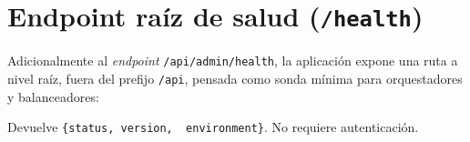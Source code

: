 \section{Endpoint raíz de salud (\texttt{/health})}
\label{sec:api-health}

Adicionalmente al \emph{endpoint} \texttt{/api/admin/health}, la aplicación
expone una ruta a nivel raíz, fuera del prefijo \texttt{/api}, pensada como
sonda mínima para orquestadores y balanceadores:

\begin{definitionlist}
  \item[\texttt{GET /health}]  Devuelve \texttt{\{status,~version,
    ~environment\}}.  No requiere autenticación.
\end{definitionlist}


